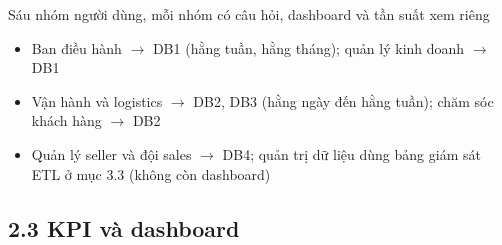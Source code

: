 \begin{frame}{Sáu nhóm người dùng, mỗi nhóm có câu hỏi, dashboard và tần suất xem riêng}
\begin{itemize}
  \item Ban điều hành $\rightarrow$ DB1 (hằng tuần, hằng tháng); quản lý kinh doanh $\rightarrow$ DB1
  \item Vận hành và logistics $\rightarrow$ DB2, DB3 (hằng ngày đến hằng tuần); chăm sóc khách hàng $\rightarrow$ DB2
  \item Quản lý seller và đội sales $\rightarrow$ DB4; quản trị dữ liệu dùng bảng giám sát ETL ở mục 3.3 (không còn dashboard)
\end{itemize}

\end{frame}

\subsection{2.3 KPI và dashboard}

